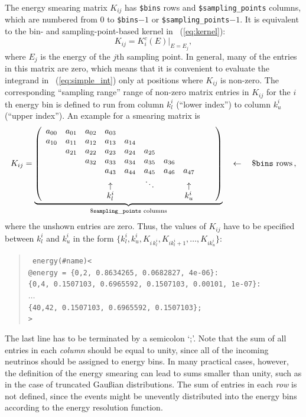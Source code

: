 The energy smearing matrix $K_{ij}$ has {\tt \$bins} rows and {\tt \$sampling\_points} columns, which are numbered from $0$ to {\tt \$bins}$-1$ or {\tt \$sampling\_points}$-1$. It is equivalent to the 
bin- and sampling-point-based kernel in \eq~(\ref{eq:kernel}):
\begin{equation}
K_{ij} = K_i^c(E) |_{E=E_j},
\label{equ:ematrix}
\end{equation}
where $E_j$ is the energy of the $j$th sampling point. In general, many of the entries in this matrix are zero, which means that it is convenient to evaluate the integrand in \eq~(\ref{eq:simple_int}) only at positions where
$K_{ij}$ is non-zero. The corresponding ``sampling range'' range of non-zero matrix entries  in $K_{ij}$ for the $i$th energy bin is defined to run from
column $k_l^i$ (``lower index'') to column $k_u^i$ (``upper index'').
An example for a smearing matrix is
\begin{equation}
K_{ij} =   \underbrace{ \left( \begin{array}{cccccccccc} 
a_{00} & a_{01} & a_{02} & a_{03} &  &  &  &  &  & \\
a_{10} & a_{11} & a_{12} & a_{13} & a_{14} &  &  &  &  &  \\
 & a_{21} & a_{22} & a_{23} & a_{24} & a_{25} &  &  &  &  \\
 &  & a_{32} & a_{33} & a_{34} & a_{35} & a_{36} &  &  &  \\
 &  &  & a_{43} & a_{44} & a_{45} & a_{46} & a_{47} &  &  \\
& & & \uparrow  & & \ddots & & \uparrow & & \\
& & & k_l^i & & & & k_u^i & & \\ 
\end{array}\right) }_{\mathtt{\$sampling\_points}  \, \, \mathrm{columns}} \quad \leftarrow \quad \footnotesize{\mathtt{\$bins} \, \, \mathrm{rows}} \, ,
\end{equation}
where the unshown entries are zero. Thus, the values of $K_{ij}$ have to be specified between $k_l^i$ and $k_u^i$ in the form $\{ k_l^i,k_u^i, K_{i \, k_l^i}, K_{i k_l^i+1} , \hdots , K_{i k_u^i} \}$:
\begin{quote}
{\tt 
energy(\#name)<\\
\tb @energy =   \{0,2, 0.8634265, 0.0682827,     4e-06\}:\\
\tb\tb \{0,4, 0.1507103, 0.6965592, 0.1507103,   0.00101,     1e-07\}:\\
\tb\tb $\ldots$\\
\tb\tb \{40,42, 0.1507103, 0.6965592, 0.1507103\};\\
>
}
\end{quote}
The last line has to be terminated by a semicolon `;'.
Note that the sum of all entries in each {\em column} should be equal 
to unity,
since all of the incoming neutrinos should be assigned to energy bins. In many practical cases, however, the definition of the energy smearing can
lead to sums smaller than unity, such as in the case of truncated Gau\ss ian
distributions. The sum of entries in each {\em row} is not defined, since the events might be unevently distributed into the energy bins
according to the energy resolution function.


